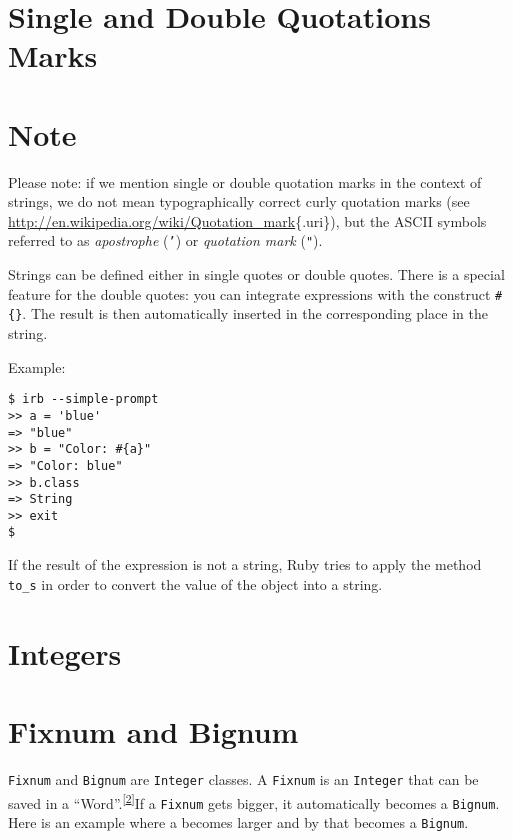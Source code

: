 \documentclass[a4paper]{book}
\begin{document}
\section{Single and Double Quotations Marks}\label{single-and-double-quotations-marks}

\section{Note}\label{note-6}

Please note: if we mention single or double quotation marks in the context of strings, we do not mean typographically correct curly quotation marks (see \url{http://en.wikipedia.org/wiki/Quotation_mark}\{.uri\}), but the ASCII symbols referred to as \emph{apostrophe} (\texttt{'}) or \emph{quotation mark} (\texttt{"}).

Strings can be defined either in single quotes or double quotes. There is a special feature for the double quotes: you can integrate expressions with the construct \texttt{\#\{\}}. The result is then automatically inserted in the corresponding place in the string.

Example:

\begin{shaded}\begin{verbatim}
$ irb --simple-prompt
>> a = 'blue'
=> "blue"
>> b = "Color: #{a}"
=> "Color: blue"
>> b.class
=> String
>> exit
$
\end{verbatim}\end{shaded}

If the result of the expression is not a string, Ruby tries to apply the method \texttt{to\_s} in order to convert the value of the object into a string.

\section{Integers}\label{integers}

\section{Fixnum and Bignum}\label{fixnum-and-bignum}

\texttt{Fixnum} and \texttt{Bignum} are \texttt{Integer} classes. A \texttt{Fixnum} is an \texttt{Integer} that can be saved in a “Word”.\textsuperscript{{[}\hyperref[ftn.idp2247056]{2}{]}}If a \texttt{Fixnum} gets bigger, it automatically becomes a \texttt{Bignum}. Here is an example where a becomes larger and by that becomes a \texttt{Bignum}.
\end{document}
